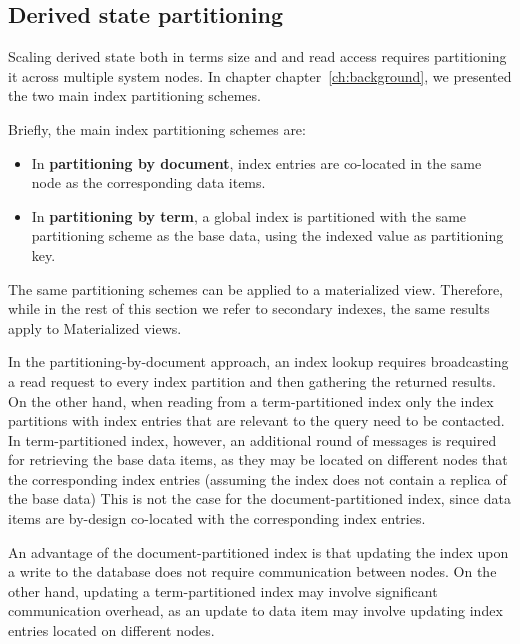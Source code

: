 \subsection{Derived state partitioning}
\label{sec:index_partitioning}


Scaling derived state both in terms size and and read access requires partitioning it across multiple system nodes.
In chapter chapter~\ref{ch:background}, we presented the two main index partitioning schemes.

Briefly, the main index partitioning schemes are:
\begin{itemize}

  \item In \textbf{partitioning by document}, index entries are co-located in the same node as the corresponding
  data items.

  \item In \textbf{partitioning by term}, a global index is partitioned with the same partitioning scheme as the base data,
  using the indexed value as partitioning key.

\end{itemize}

The same partitioning schemes can be applied to a materialized view.
Therefore, while in the rest of this section we refer to secondary indexes, the same results apply to Materialized
views.

\medskip

In the partitioning-by-document approach, an index lookup requires broadcasting a read request to every index partition
and then gathering the returned results.
On the other hand, when reading from a term-partitioned index only the index partitions with index entries that are
relevant to the query need to be contacted.
In term-partitioned index, however, an additional round of messages is required for retrieving the base data items,
as they may be located on different nodes that the corresponding index entries (assuming the index does not contain a
replica of the base data)
This is not the case for the document-partitioned index, since data items are by-design co-located with the corresponding
index entries.

An advantage of the document-partitioned index is that updating the index upon a write to the database does not require
communication between nodes.
On the other hand, updating a term-partitioned index may involve significant communication overhead, as an update to data
item may involve updating index entries located on different nodes.


